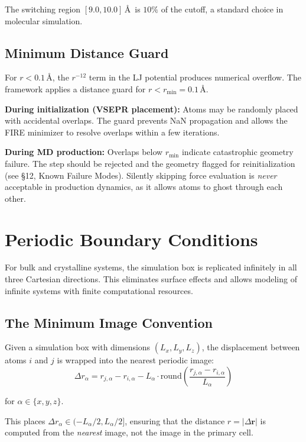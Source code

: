 \documentclass[11pt]{article}
\begin{document}
The switching region $[9.0, 10.0]$\,\AA\ is $10\%$ of the cutoff, a standard choice in molecular simulation.

\subsection{Minimum Distance Guard}

For $r < 0.1$\,\AA, the $r^{-12}$ term in the LJ potential produces numerical overflow. The framework applies a distance guard for $r < r_{\min} = 0.1$\,\AA.

\textbf{During initialization (VSEPR placement):} Atoms may be randomly placed with accidental overlaps. The guard prevents NaN propagation and allows the FIRE minimizer to resolve overlaps within a few iterations.

\textbf{During MD production:} Overlaps below $r_{\min}$ indicate catastrophic geometry failure. The step should be rejected and the geometry flagged for reinitialization (see \S12, Known Failure Modes). Silently skipping force evaluation is \textit{never} acceptable in production dynamics, as it allows atoms to ghost through each other.

\section{Periodic Boundary Conditions}

For bulk and crystalline systems, the simulation box is replicated infinitely in all three Cartesian directions. This eliminates surface effects and allows modeling of infinite systems with finite computational resources.

\subsection{The Minimum Image Convention}

Given a simulation box with dimensions $(L_x, L_y, L_z)$, the displacement between atoms $i$ and $j$ is wrapped into the nearest periodic image:
\begin{equation}
\Delta r_\alpha = r_{j,\alpha} - r_{i,\alpha} - L_\alpha \cdot \text{round}\left(\frac{r_{j,\alpha} - r_{i,\alpha}}{L_\alpha}\right)
\end{equation}

for $\alpha \in \{x, y, z\}$.

This places $\Delta r_\alpha \in (-L_\alpha/2, L_\alpha/2]$, ensuring that the distance $r = |\Delta\mathbf{r}|$ is computed from the \textit{nearest} image, not the image in the primary cell.
\end{document}
